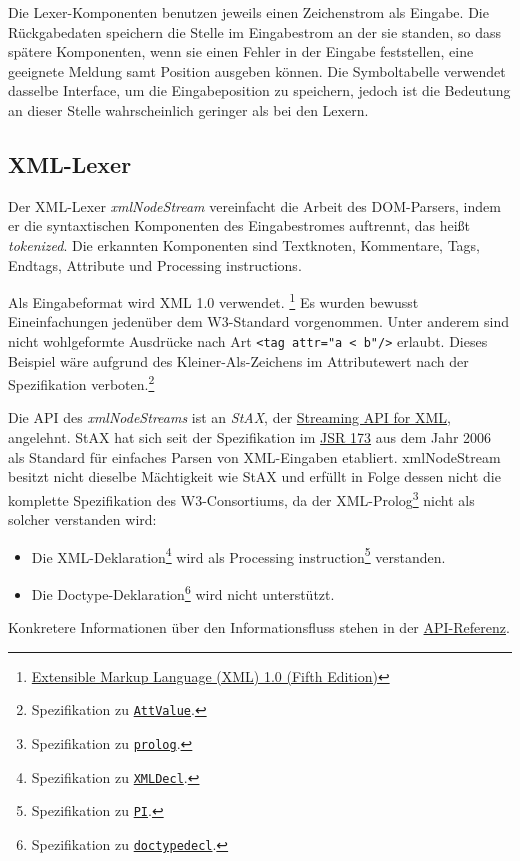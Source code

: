\documentclass[10pt,a4paper,ngerman,titlepage,tocindentauto]{article}
\newcommand{\xmlNote}[2]{\footnote{Spezifikation zu \href{http://www.w3.org/TR/2008/REC-xml-20081126/\#{#1}}{\texttt{#2}}.}}
\begin{document}
		Die Lexer-Komponenten benutzen jeweils einen Zeichenstrom als Eingabe. Die Rückgabedaten speichern die
		Stelle im Eingabestrom an der sie standen, so dass spätere Komponenten, wenn sie einen Fehler
		in der Eingabe feststellen, eine geeignete Meldung samt Position ausgeben können.
		Die Symboltabelle verwendet dasselbe Interface, um die Eingabeposition zu speichern, jedoch ist
		die Bedeutung an dieser Stelle wahrscheinlich geringer als bei den Lexern.
		
		\subsection{XML-Lexer}
			Der XML-Lexer {\em xmlNodeStream} vereinfacht die Arbeit des DOM-Parsers, indem er die syntaxtischen
			Komponenten des Eingabestromes auftrennt, das heißt {\em tokenized}.
			Die erkannten Komponenten sind Textknoten, Kommentare, Tags, Endtags, Attribute und Processing instructions.
			
			Als Eingabeformat wird XML 1.0 verwendet.%
			\footnote{\href{http://www.w3.org/TR/2008/REC-xml-20081126/}{Extensible Markup Language (XML) 1.0 (Fifth Edition)}}
			Es wurden bewusst Eineinfachungen jedenüber dem W3-Standard vorgenommen. Unter anderem sind
			nicht wohlgeformte Ausdrücke nach Art \verb|<tag attr="a < b"/>| erlaubt.
			Dieses Beispiel wäre aufgrund des Kleiner-Als-Zeichens im Attributewert
			nach der Spezifikation verboten.\xmlNote{NT-AttValue}{AttValue}
			
			Die API des {\em xmlNodeStreams} ist an {\em StAX}, der \href{http://stax.codehaus.org/}{Streaming API for XML},
			angelehnt. StAX hat sich seit der Spezifikation im \href{http://jcp.org/en/jsr/detail?id=173}{JSR 173} aus
			dem Jahr 2006 als Standard für einfaches Parsen von XML-Eingaben etabliert.
			xmlNodeStream besitzt nicht dieselbe Mächtigkeit wie StAX und erfüllt in Folge dessen
			nicht die komplette Spezifikation des W3-Consortiums, da der XML-Prolog\xmlNote{xmldoc}{prolog}
			nicht als solcher verstanden wird:
			\begin{itemize}
				\item
					Die XML-Deklaration\xmlNote{NT-XMLDecl}{XMLDecl} wird als
					Processing instruction\xmlNote{NT-PI}{PI} verstanden.
				\item
					Die Doctype-Deklaration\xmlNote{NT-doctypedecl}{doctypedecl} wird nicht unterstützt.
			\end{itemize}
			Konkretere Informationen über den Informationsfluss stehen in der \hyperlink{XML-Lexer-API}{API-Referenz}.
			
\end{document}
